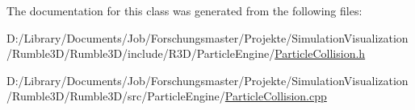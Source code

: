 The documentation for this class was generated from the following files\+:\begin{DoxyCompactItemize}
\item 
D\+:/\+Library/\+Documents/\+Job/\+Forschungsmaster/\+Projekte/\+Simulation\+Visualization/\+Rumble3\+D/\+Rumble3\+D/include/\+R3\+D/\+Particle\+Engine/\mbox{\hyperlink{_particle_collision_8h}{Particle\+Collision.\+h}}\item 
D\+:/\+Library/\+Documents/\+Job/\+Forschungsmaster/\+Projekte/\+Simulation\+Visualization/\+Rumble3\+D/\+Rumble3\+D/src/\+Particle\+Engine/\mbox{\hyperlink{_particle_collision_8cpp}{Particle\+Collision.\+cpp}}\end{DoxyCompactItemize}
